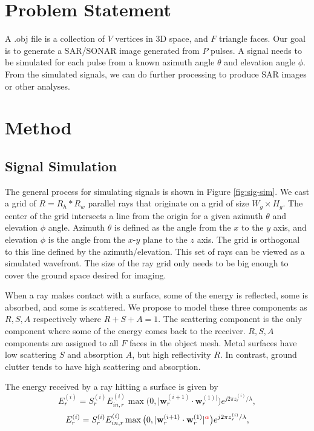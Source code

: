 \documentclass[onecolumn]{IEEEtran}
\begin{document}
\section{Problem Statement}
\label{sec:problem}
A .obj file is a collection of $V$ vertices in 3D space, and $F$ triangle faces. Our goal is to generate a SAR/SONAR image generated from $P$ pulses. A signal needs to be simulated for each pulse from a known azimuth angle $\theta$ and elevation angle $\phi$. From the simulated signals, we can do further processing to produce SAR images or other analyses.

\section{Method}
\label{sec:method}

\subsection{Signal Simulation}


The general process for simulating signals is shown in Figure \ref{fig:sig-sim}. We cast a grid of $R = R_h*R_w$ parallel rays that originate on a grid of size $W_g \times H_g$. The center of the grid intersects a line from the origin for a given azimuth $\theta$ and elevation $\phi$ angle. Azimuth $\theta$ is defined as the angle from the $x$ to the $y$ axis, and elevation $\phi$ is the angle from the $x$-$y$ plane to the $z$ axis. The grid is orthogonal to this line defined by the azimuth/elevation. This set of rays can be viewed as a simulated wavefront. The size of the ray grid only needs to be big enough to cover the ground space desired for imaging.

When a ray makes contact with a surface, some of the energy is reflected, some is absorbed, and some is scattered. We propose to model these three components as $R,S,A$ respectively where $R+S+A=1$. The scattering component is the only component where some of the energy comes back to the receiver. $R,S,A$ components are assigned to all $F$ faces in the object mesh. Metal surfaces have low scattering $S$ and absorption $A$, but high reflectivity $R$. In contrast, ground clutter tends to have high scattering and absorption.

The energy received by a ray hitting a surface is given by
\begin{equation}
    E^{(i)}_r = S_r^{(i)}E^{(i)}_{in,r}\max \big(0,|\mathbf{w}_{r}^{(i+1)} \cdot \mathbf{w}_{r}^{(1)|} \big)e^{j2\pi z_r^{(i)}/\lambda}
    ,
    \label{eq:returned-energy}
\end{equation}
\begin{equation}
    E^{(i)}_r = S_r^{(i)}E^{(i)}_{in,r}\max \big(0,|\mathbf{w}_{r}^{(i+1)} \cdot \mathbf{w}_{r}^{(1)}|^{\textcolor{red}{\alpha}} \big)e^{j2\pi z_r^{(i)}/\lambda}
    ,
    \label{eq:returned-energy-v2}
\end{equation}
\end{document}
